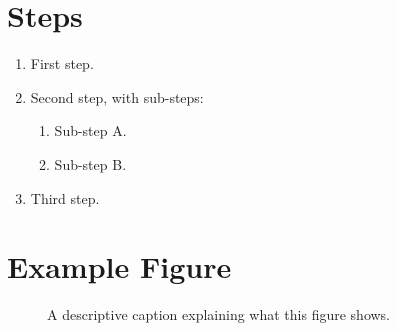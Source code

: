 \documentclass[12pt]{article}
\begin{document}
\section*{Steps}
\begin{enumerate}
    \item First step.
    \item Second step, with sub-steps:
        \begin{enumerate}
            \item Sub-step A.
            \item Sub-step B.
        \end{enumerate}
    \item Third step.
\end{enumerate}


%
\section*{Example Figure}

\begin{figure}[h]
    \centering
    \caption{A descriptive caption explaining what this figure shows.}
    \label{fig:example}
\end{figure}


\end{document}
